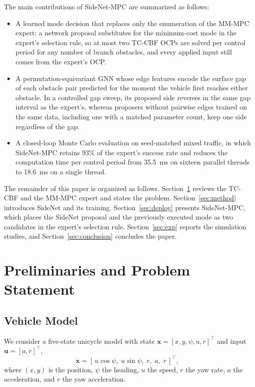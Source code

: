 \documentclass{article}
\theoremstyle{definition}
\begin{document}
The main contributions of SideNet-MPC are summarized as follows:
\begin{itemize}
\item A learned mode decision that replaces only the enumeration of the MM-MPC expert: a network proposal substitutes for the minimum-cost mode in the expert's selection rule, so at most two TC-CBF OCPs are solved per control period for any number of branch obstacles, and every applied input still comes from the expert's OCP.
\item A permutation-equivariant GNN whose edge features encode the surface gap of each obstacle pair predicted for the moment the vehicle first reaches either obstacle. In a controlled gap sweep, its proposed side reverses in the same gap interval as the expert's, whereas proposers without pairwise edges trained on the same data, including one with a matched parameter count, keep one side regardless of the gap.
\item A closed-loop Monte Carlo evaluation on seed-matched mixed traffic, in which SideNet-MPC retains $93\%$ of the expert's success rate and reduces the computation time per control period from \SI{35.5}{ms} on sixteen parallel threads to \SI{18.6}{ms} on a single thread.
\end{itemize}

The remainder of this paper is organized as follows. Section~\ref{sec:prelim} reviews the TC-CBF and the MM-MPC expert and states the problem. Section~\ref{sec:method} introduces SideNet and its training. Section~\ref{sec:deploy} presents SideNet-MPC, which places the SideNet proposal and the previously executed mode as two candidates in the expert's selection rule. Section~\ref{sec:exp} reports the simulation studies, and Section~\ref{sec:conclusion} concludes the paper.

\section{Preliminaries and Problem Statement}
\label{sec:prelim}

\subsection{Vehicle Model}

We consider a five-state unicycle model with state $\mathbf{x}=[x,y,\psi,u,r]^\top$ and input $\mathbf{u}=[a,\dot r]^\top$,
\begin{equation}
\dot{\mathbf{x}} = [\,u\cos\psi,\; u\sin\psi,\; r,\; a,\; \dot r\,]^\top,
\label{eq:model}
\end{equation}
where $(x,y)$ is the position, $\psi$ the heading, $u$ the speed, $r$ the yaw rate, $a$ the acceleration, and $\dot r$ the yaw acceleration.
\end{document}
